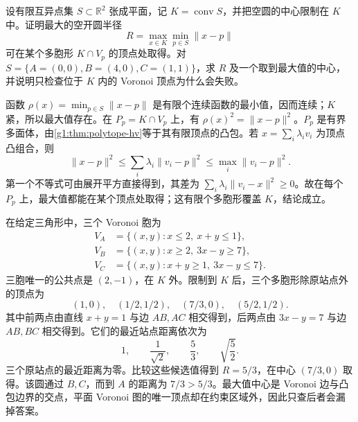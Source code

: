 \begin{exercise}\label{g1:ex:largest-empty-disk-constrained}
	设有限互异点集 \(S\subset\mathbb R^2\) 张成平面，记 \(K=\operatorname{conv}S\)，并把空圆的中心限制在 \(K\) 中。证明最大的空开圆半径
	\[
		R=\max_{x\in K}\min_{p\in S}\lVert x-p\rVert
	\]
	可在某个多胞形 \(K\cap V_p\) 的顶点处取得。对 \(S=\{A=(0,0),B=(4,0),C=(1,1)\}\)，求 \(R\) 及一个取到最大值的中心，并说明只检查位于 \(K\) 内的 Voronoi 顶点为什么会失败。
\end{exercise}
\begin{solution}
	函数 \(\rho(x)=\min_{p\in S}\lVert x-p\rVert\) 是有限个连续函数的最小值，因而连续；\(K\) 紧，所以最大值存在。在 \(P_p=K\cap V_p\) 上，有 \(\rho(x)^2=\lVert x-p\rVert^2\)。\(P_p\) 是有界多面体，由\cref{g1:thm:polytope-hv}等于其有限顶点的凸包。若 \(x=\sum_i\lambda_i v_i\) 为顶点凸组合，则
	\[
		\lVert x-p\rVert^2
		\le\sum_i\lambda_i\lVert v_i-p\rVert^2
		\le\max_i\lVert v_i-p\rVert^2.
	\]
	第一个不等式可由展开平方直接得到，其差为 \(\sum_i\lambda_i\lVert v_i-x\rVert^2\ge0\)。故在每个 \(P_p\) 上，最大值都能在某个顶点处取得；这有限个多胞形覆盖 \(K\)，结论成立。

	在给定三角形中，三个 Voronoi 胞为
	\[
		\begin{aligned}
			V_A&=\{(x,y):x\le2,\ x+y\le1\},\\
			V_B&=\{(x,y):x\ge2,\ 3x-y\ge7\},\\
			V_C&=\{(x,y):x+y\ge1,\ 3x-y\le7\}.
		\end{aligned}
	\]
	三胞唯一的公共点是 \((2,-1)\)，在 \(K\) 外。限制到 \(K\) 后，三个多胞形除原站点外的顶点为
	\[
		(1,0),\quad (1/2,1/2),\quad (7/3,0),\quad (5/2,1/2).
	\]
	其中前两点由直线 \(x+y=1\) 与边 \(AB,AC\) 相交得到，后两点由 \(3x-y=7\) 与边 \(AB,BC\) 相交得到。它们的最近站点距离依次为
	\[
		1,\qquad \frac1{\sqrt2},\qquad \frac53,\qquad \sqrt{\frac52}.
	\]
	三个原站点的最近距离为零。比较这些候选值得到 \(R=5/3\)，在中心 \((7/3,0)\) 取得。该圆通过 \(B,C\)，而到 \(A\) 的距离为 \(7/3>5/3\)。最大值中心是 Voronoi 边与凸包边界的交点，平面 Voronoi 图的唯一顶点却在约束区域外，因此只查后者会漏掉答案。
\end{solution}

